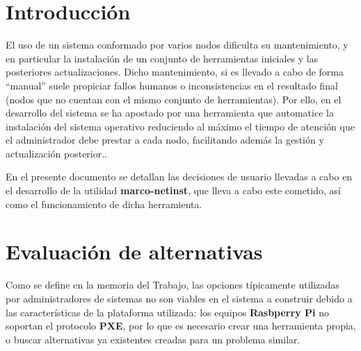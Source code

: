 \documentclass{article}
\title{\hmwkTitle}
\author{\textbf{\hmwkAuthorName}}
\date{\hmwkDueDate}
\begin{document}
\maketitle
\begin{abstract}
Marcobootstrap comprende un conjunto de utilidades que permite llevar a cabo la descarga, instalación y actualización de un sistema operativo en varios nodos sin requerir la supervisión de un administrador, incluyendo el descubrimiento de los equipos necesarios para el desarrollo de dichas operaciones.
\end{abstract}


\setcounter{tocdepth}{1}

\tableofcontents
\newpage

\section{Introducción}

El uso de un sistema conformado por varios nodos dificulta su mantenimiento, y en particular la instalación de un conjunto de herramientas iniciales y las posteriores actualizaciones. Dicho mantenimiento, si es llevado a cabo de forma ``manual'' suele propiciar fallos humanos o inconsistencias en el resultado final (nodos que no cuentan con el mismo conjunto de herramientas). Por ello, en el desarrollo del sistema se ha apostado por una herramienta que automatice la instalación del sistema operativo reduciendo al máximo el tiempo de atención que el administrador debe prestar a cada nodo, facilitando además la gestión y actualización posterior..

En el presente documento se detallan las decisiones de usuario llevadas a cabo en el desarrollo de la utilidad \textbf{marco-netinst}, que lleva a cabo este cometido, así como el funcionamiento de dicha herramienta.

\section{Evaluación de alternativas}

Como se define en la memoria del Trabajo, las opciones típicamente utilizadas por administradores de sistemas no son viables en el sistema a construir debido a las características de la plataforma utilizada: los equipos \textbf{Rasbperry Pi} no soportan el protocolo \textbf{PXE}, por lo que es necesario crear una herramienta propia, o buscar alternativas ya existentes creadas para un problema similar.
\end{document}
